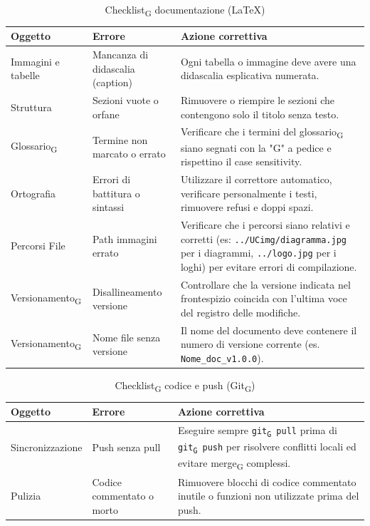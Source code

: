 \documentclass[11pt,a4paper]{article}
\newcommand{\gls}[1]{#1\textsubscript{G}}
\begin{document}
\begin{table}[H]
    \centering
    \renewcommand{\arraystretch}{1.4}
    \begin{tabular}{|l|>{\raggedright\arraybackslash}p{}|>{\raggedright\arraybackslash}p{}|}
        \hline
        \textbf{Oggetto} & \textbf{Errore} & \textbf{Azione correttiva} \\
        \hline
        Immagini e tabelle & Mancanza di didascalia (caption) & Ogni tabella o immagine deve avere una didascalia esplicativa numerata. \\
        \hline
        Struttura & Sezioni vuote o orfane & Rimuovere o riempire le sezioni che contengono solo il titolo senza testo. \\
        \hline
        \gls{Glossario} & Termine non marcato o errato & Verificare che i termini del \gls{glossario} siano segnati con la "G" a pedice e rispettino il case sensitivity. \\
        \hline
        Ortografia & Errori di battitura o sintassi & Utilizzare il correttore automatico, verificare personalmente i testi, rimuovere refusi e doppi spazi. \\
        \hline
        Percorsi File & Path immagini errato & Verificare che i percorsi siano relativi e corretti (es: \texttt{../UCimg/diagramma.jpg} per i diagrammi, \texttt{../logo.jpg} per i loghi) per evitare errori di compilazione.\\
        \hline
        \gls{Versionamento} & Disallineamento versione & Controllare che la versione indicata nel frontespizio coincida con l'ultima voce del registro delle modifiche. \\
        \hline
        \gls{Versionamento} & Nome file senza versione & Il nome del documento deve contenere il numero di versione corrente (es. \texttt{Nome\_doc\_v1.0.0}). \\
        \hline
    \end{tabular}
    \caption{\gls{Checklist} documentazione (LaTeX)}
\end{table}

\begin{table}[H]
    \centering
    \renewcommand{\arraystretch}{1.4}
    \begin{tabular}{|l|>{\raggedright\arraybackslash}p{}|>{\raggedright\arraybackslash}p{}|}
        \hline
        \textbf{Oggetto} & \textbf{Errore} & \textbf{Azione correttiva} \\
        \hline
        Sincronizzazione & Push senza pull & Eseguire sempre \texttt{\gls{git} pull} prima di \texttt{\gls{git} push} per risolvere conflitti locali ed evitare \gls{merge} complessi. \\
        \hline
        Pulizia & Codice commentato o morto & Rimuovere blocchi di codice commentato inutile o funzioni non utilizzate prima del push. \\
        \hline
    \end{tabular}
    \caption{\gls{Checklist} codice e push (\gls{Git})}
\end{table}
\end{document}
